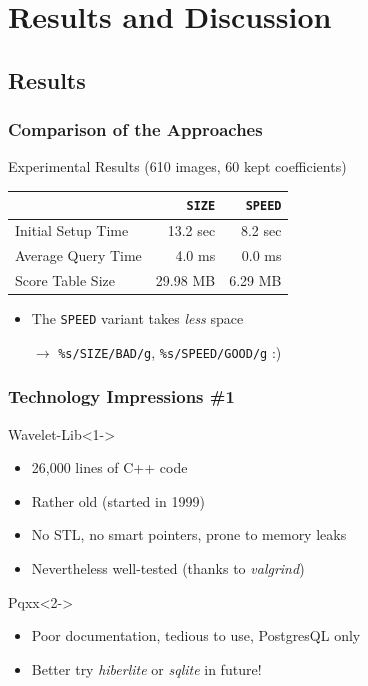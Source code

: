 \documentclass{beamer}
\newcommand\rarrow{$\longrightarrow$ } %
\begin{document}
\section{Results and Discussion}

\subsection{Results}

\begin{frame}
  \frametitle{Comparison of the Approaches}

    \begin{block}{Experimental Results (610 images, 60 kept coefficients)}
      \begin{center}
        \begin{tabular}{|l|r|r|}\hline
          ~ & \texttt{SIZE} & \texttt{SPEED} \\ \hline\hline
          Initial Setup Time & 13.2 sec & 8.2 sec \\ \hline
          Average Query Time & 4.0 ms  & 0.0 ms \\ \hline
          Score Table Size & 29.98 MB  & 6.29 MB \\ \hline
        \end{tabular}
      \end{center}
    \end{block}

    \pause
    \begin{itemize}
      \item The \texttt{SPEED} variant takes \emph{less} space

        \pause
        \rarrow \texttt{\%s/SIZE/BAD/g}\pause, \texttt{\%s/SPEED/GOOD/g} \pause :)
      \end{itemize}

\end{frame}

\begin{frame}
  \frametitle{Technology Impressions \#1}

  \begin{block}{Wavelet-Lib}<1->
    \begin{itemize}
    \item 26,000 lines of C++ code
    \item Rather old (started in 1999)
    \item No STL, no smart pointers, prone to memory leaks
    \item Nevertheless well-tested (thanks to \emph{valgrind})
    \end{itemize}
  \end{block}

  \begin{block}{Pqxx}<2->
    \begin{itemize}
    \item Poor documentation, tedious to use, PostgresQL only
    \item Better try \emph{hiberlite} or \emph{sqlite} in future!
    \end{itemize}
  \end{block}
  
\end{frame}
\end{document}

